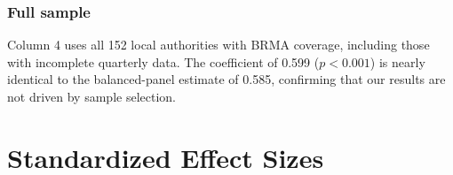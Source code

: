 \documentclass[12pt]{article}
\begin{document}
\subsubsection*{Full sample} Column 4 uses all 152 local authorities with BRMA coverage, including those with incomplete quarterly data. The coefficient of 0.599 ($p < 0.001$) is nearly identical to the balanced-panel estimate of 0.585, confirming that our results are not driven by sample selection.


\section{Standardized Effect Sizes}
\label{sec:sde}


\end{document}

